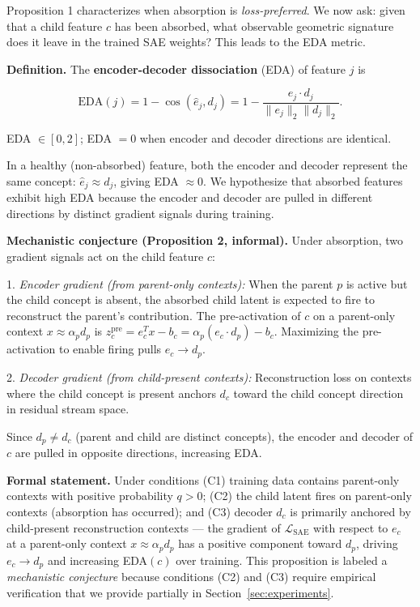 \documentclass{article}
\begin{document}
Proposition 1 characterizes when absorption is \emph{loss-preferred}. We now ask: given
that a child feature $c$ has been absorbed, what observable geometric signature does it
leave in the trained SAE weights? This leads to the EDA metric.

\textbf{Definition.} The \textbf{encoder-decoder dissociation} (EDA) of feature $j$ is

$$\text{EDA}(j) = 1 - \cos(\hat{e}_j, d_j) = 1 - \frac{e_j \cdot d_j}{\|e_j\|_2 \|d_j\|_2}.$$

EDA $\in [0, 2]$; EDA $= 0$ when encoder and decoder directions are identical.

In a healthy (non-absorbed) feature, both the encoder and decoder represent the same concept:
$\hat{e}_j \approx d_j$, giving EDA $\approx 0$. We hypothesize that absorbed features
exhibit high EDA because the encoder and decoder are pulled in different directions by
distinct gradient signals during training.

\textbf{Mechanistic conjecture (Proposition 2, informal).} Under absorption, two gradient signals
act on the child feature $c$:

1. \textit{Encoder gradient (from parent-only contexts):} When the parent $p$ is active but the
   child concept is absent, the absorbed child latent is expected to fire to reconstruct
   the parent's contribution. The pre-activation of $c$ on a parent-only context $x \approx
   \alpha_p d_p$ is $z_c^\text{pre} = e_c^T x - b_c = \alpha_p (e_c \cdot d_p) - b_c$.
   Maximizing the pre-activation to enable firing pulls $e_c \to d_p$.

2. \textit{Decoder gradient (from child-present contexts):} Reconstruction loss on contexts where
   the child concept is present anchors $d_c$ toward the child concept direction in
   residual stream space.

Since $d_p \neq d_c$ (parent and child are distinct concepts), the encoder and decoder of
$c$ are pulled in opposite directions, increasing EDA.

\textbf{Formal statement.} Under conditions (C1) training data contains parent-only contexts
with positive probability $q > 0$; (C2) the child latent fires on parent-only contexts
(absorption has occurred); and (C3) decoder $d_c$ is primarily anchored by child-present
reconstruction contexts — the gradient of $\mathcal{L}_\text{SAE}$ with respect to $e_c$
at a parent-only context $x \approx \alpha_p d_p$ has a positive component toward $d_p$,
driving $e_c \to d_p$ and increasing EDA$(c)$ over training. This proposition is labeled a
\emph{mechanistic conjecture} because conditions (C2) and (C3) require empirical verification
that we provide partially in Section~\ref{sec:experiments}.
\end{document}
